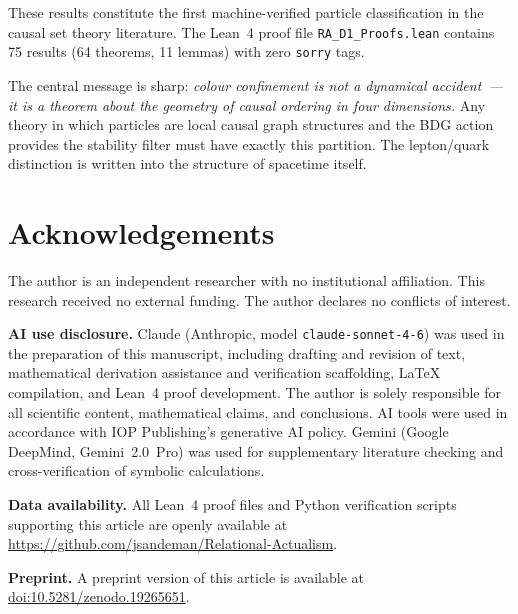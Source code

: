 \documentclass[11pt,a4paper]{article}
\begin{document}
These results constitute the first machine-verified particle classification
in the causal set theory literature. The Lean~4 proof file
\texttt{RA\_D1\_Proofs.lean} contains 75 results (64 theorems, 11 lemmas)
with zero \texttt{sorry} tags.

The central message is sharp: \emph{colour confinement is not a dynamical
accident~--- it is a theorem about the geometry of causal ordering in four
dimensions.} Any theory in which particles are local causal graph structures
and the BDG action provides the stability filter must have exactly this
partition. The lepton/quark distinction is written into the structure of
spacetime itself.



\medskip


\section*{Acknowledgements}

The author is an independent researcher with no institutional affiliation.
This research received no external funding.
The author declares no conflicts of interest.

\smallskip\noindent
\textbf{AI use disclosure.}
Claude (Anthropic, model \texttt{claude-sonnet-4-6}) was used in the
preparation of this manuscript, including drafting and revision of text,
mathematical derivation assistance and verification scaffolding,
\LaTeX{} compilation, and Lean~4 proof development.
The author is solely responsible for all scientific content,
mathematical claims, and conclusions.
AI tools were used in accordance with IOP Publishing's generative AI policy.
Gemini (Google DeepMind, Gemini~2.0~Pro) was used for supplementary
literature checking and cross-verification of symbolic calculations.

\smallskip\noindent
\textbf{Data availability.}
All Lean~4 proof files and Python verification scripts supporting this
article are openly available at
\url{https://github.com/jsandeman/Relational-Actualism}.

\smallskip\noindent
\textbf{Preprint.}
A preprint version of this article is available at
\href{https://doi.org/10.5281/zenodo.19265651}{doi:10.5281/zenodo.19265651}.
\end{document}
